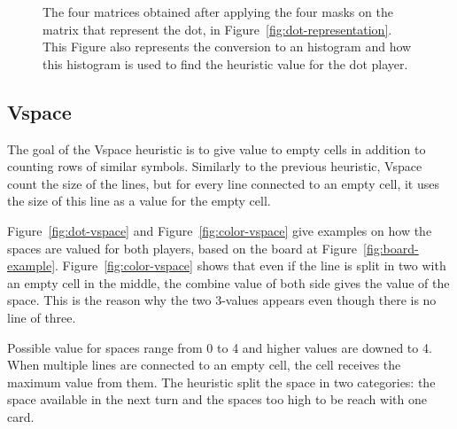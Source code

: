 \documentclass[runningheads]{llncs}
\begin{document}
\begin{figure}[ht]
		\caption{The four matrices obtained after applying the four masks on the matrix that represent the dot, in Figure~\ref{fig:dot-representation}.
						This Figure also represents the conversion to an histogram and how this histogram is used to find the heuristic value for the dot player.}
		\label{fig:convolution-results}
\end{figure}

\clearpage
\subsection{Vspace}
The goal of the Vspace heuristic is to give value to empty
cells in addition to counting rows of similar
symbols. Similarly to the previous heuristic,
Vspace count the size of the lines, but for every
line connected to an empty cell, it uses the
size of this line as a value for the empty cell.

Figure~\ref{fig:dot-vspace} and
Figure~\ref{fig:color-vspace} give examples on
how the spaces are valued for both players, based
on the board at Figure~\ref{fig:board-example}.
Figure~\ref{fig:color-vspace} shows that even if
the line is split in two with an empty cell in the
middle, the combine value of both side gives the
value of the space. This is the reason why the two
3-values appears even though there is no line of
three.

Possible value for spaces range from 0 to 4 and
higher values are downed to 4. When multiple lines
are connected to an empty cell, the cell receives
the maximum value from them. The heuristic split the
space in two categories: the space available in
the next turn and the spaces too high to be reach
with one card.
\end{document}
